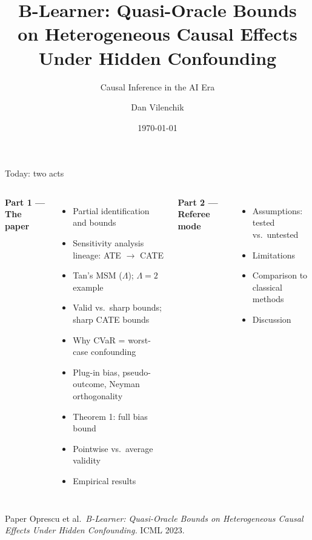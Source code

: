 \documentclass[aspectratio=169]{beamer}
\title[B-Learner]{B-Learner: Quasi-Oracle Bounds on Heterogeneous Causal Effects Under Hidden Confounding}
\subtitle{Causal Inference in the AI Era}
\author{Dan Vilenchik}
\institute{Ben-Gurion University of the Negev}
\date{\today}
\begin{document}
\begin{frame}
  \titlepage
\end{frame}


\begin{frame}{Today: two acts}
\begin{columns}
\textbf{Part 1 — The paper}
\begin{itemize}\small
  \item Partial identification and bounds
  \item Sensitivity analysis lineage: ATE $\to$ CATE
  \item Tan's MSM ($\Lambda$); $\Lambda=2$ example
  \item Valid vs.\ sharp bounds; sharp CATE bounds
  \item Why CVaR = worst-case confounding
  \item Plug-in bias, pseudo-outcome, Neyman orthogonality
  \item Theorem 1: full bias bound
  \item Pointwise vs.\ average validity
  \item Empirical results
\end{itemize}

\textbf{Part 2 — Referee mode}
\begin{itemize}\small
  \item Assumptions: tested vs.\ untested
  \item Limitations
  \item Comparison to classical methods
  \item Discussion
\end{itemize}
\end{columns}

\vspace{0.4em}
\begin{block}{Paper}
\small Oprescu et al.\ \emph{B-Learner: Quasi-Oracle Bounds on Heterogeneous Causal Effects Under Hidden Confounding.} ICML 2023.
\end{block}
\end{frame}

\end{document}
